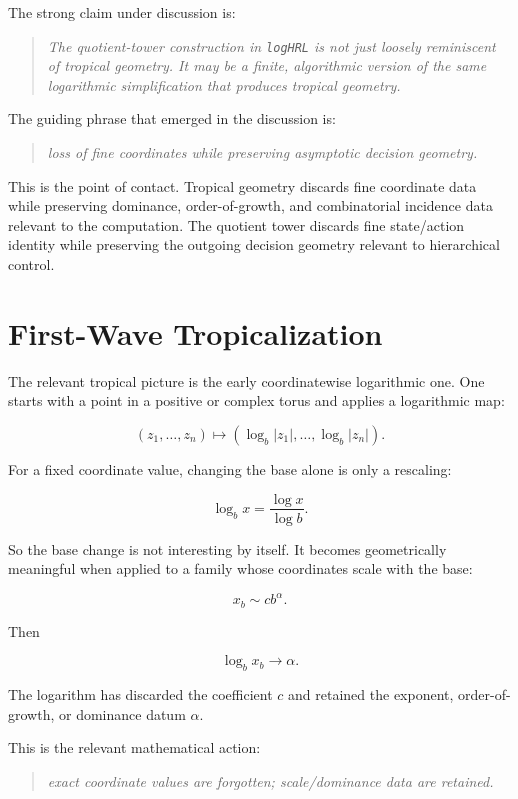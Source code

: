 \documentclass[11pt]{article}
\newcommand{\logHRL}{\texttt{logHRL}}
\newenvironment{claimbox}
  {\begin{quote}\itshape}
  {\end{quote}}
\begin{document}
The strong claim under discussion is:

\begin{claimbox}
The quotient-tower construction in \logHRL{} is not just loosely reminiscent of
tropical geometry. It may be a finite, algorithmic version of the same
logarithmic simplification that produces tropical geometry.
\end{claimbox}

The guiding phrase that emerged in the discussion is:

\begin{claimbox}
loss of fine coordinates while preserving asymptotic decision geometry.
\end{claimbox}

This is the point of contact. Tropical geometry discards fine coordinate data
while preserving dominance, order-of-growth, and combinatorial incidence data
relevant to the computation. The quotient tower discards fine state/action
identity while preserving the outgoing decision geometry relevant to
hierarchical control.

\section{First-Wave Tropicalization}

The relevant tropical picture is the early coordinatewise logarithmic one. One
starts with a point in a positive or complex torus and applies a logarithmic
map:

\[
(z_1,\dots,z_n)
\longmapsto
(\log_b |z_1|,\dots,\log_b |z_n|).
\]

For a fixed coordinate value, changing the base alone is only a rescaling:

\[
\log_b x
=
\frac{\log x}{\log b}.
\]

So the base change is not interesting by itself. It becomes geometrically
meaningful when applied to a family whose coordinates scale with the base:

\[
x_b \sim c b^\alpha.
\]

Then

\[
\log_b x_b \to \alpha.
\]

The logarithm has discarded the coefficient \(c\) and retained the exponent,
order-of-growth, or dominance datum \(\alpha\).

This is the relevant mathematical action:

\begin{claimbox}
exact coordinate values are forgotten; scale/dominance data are retained.
\end{claimbox}
\end{document}

